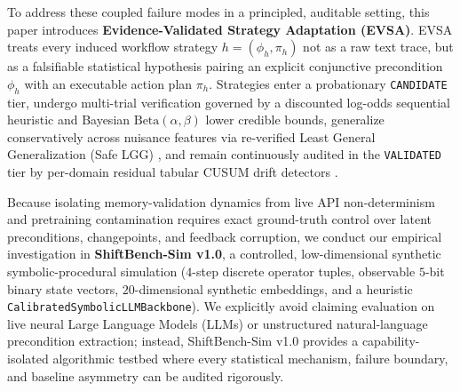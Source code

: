 \documentclass[10pt,letterpaper]{article}
\begin{document}
To address these coupled failure modes in a principled, auditable setting, this paper introduces \textbf{Evidence-Validated Strategy Adaptation (EVSA)}. EVSA treats every induced workflow strategy $h = (\phi_h, \pi_h)$ not as a raw text trace, but as a falsifiable statistical hypothesis pairing an explicit conjunctive precondition $\phi_h$ with an executable action plan $\pi_h$. Strategies enter a probationary \texttt{CANDIDATE} tier, undergo multi-trial verification governed by a discounted log-odds sequential heuristic and Bayesian $\mathrm{Beta}(\alpha,\beta)$ lower credible bounds, generalize conservatively across nuisance features via re-verified Least General Generalization (Safe LGG) \cite{plotkin1970inductive}, and remain continuously audited in the \texttt{VALIDATED} tier by per-domain residual tabular CUSUM drift detectors \cite{page1954continuous}.

Because isolating memory-validation dynamics from live API non-determinism and pretraining contamination requires exact ground-truth control over latent preconditions, changepoints, and feedback corruption, we conduct our empirical investigation in \textbf{ShiftBench-Sim v1.0}, a controlled, low-dimensional synthetic symbolic-procedural simulation ($4$-step discrete operator tuples, observable $5$-bit binary state vectors, $20$-dimensional synthetic embeddings, and a heuristic \texttt{CalibratedSymbolicLLMBackbone}). We explicitly avoid claiming evaluation on live neural Large Language Models (LLMs) or unstructured natural-language precondition extraction; instead, ShiftBench-Sim v1.0 provides a capability-isolated algorithmic testbed where every statistical mechanism, failure boundary, and baseline asymmetry can be audited rigorously.
\end{document}
